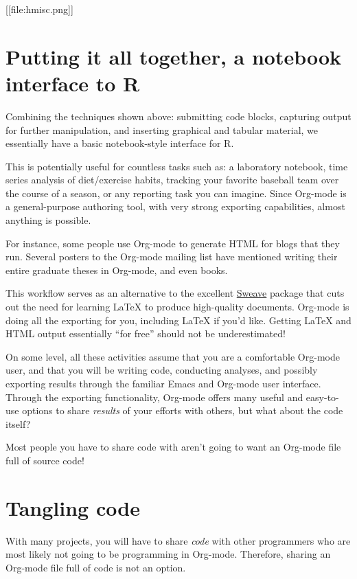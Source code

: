 \documentclass[11pt]{article}
\begin{document}
[[file:hmisc.png]]
\section*{Putting it all together, a notebook interface to R}
\label{sec-7}

Combining the techniques shown above: submitting code blocks,
capturing output for further manipulation, and inserting graphical and
tabular material, we essentially have a basic notebook-style interface
for R.

This is potentially useful for countless tasks such as: a laboratory
notebook, time series analysis of diet/exercise habits, tracking your
favorite baseball team over the course of a season, or any reporting
task you can imagine. Since Org-mode is a general-purpose authoring
tool, with very strong exporting capabilities, almost anything is
possible.

For instance, some people use Org-mode to generate HTML for blogs that
they run. Several posters to the Org-mode mailing list have mentioned
writing their entire graduate theses in Org-mode, and even books.

This workflow serves as an alternative to the excellent \href{http://www.stat.uni-muenchen.de/~leisch/Sweave/}{Sweave} package
that cuts out the need for learning \LaTeX{} to produce high-quality
documents. Org-mode is doing all the exporting for you, including
\LaTeX{} if you'd like. Getting \LaTeX{} and HTML output essentially ``for
free'' should not be underestimated!

On some level, all these activities assume that you are a comfortable
Org-mode user, and that you will be writing code, conducting analyses,
and possibly exporting results through the familiar Emacs and Org-mode
user interface. Through the exporting functionality, Org-mode offers
many useful and easy-to-use options to share \emph{results} of your efforts
with others, but what about the code itself?

Most people you have to share code with aren't going to want an
Org-mode file full of source code!
\section*{Tangling code}
\label{sec-8}

With many projects, you will have to share \emph{code} with other
programmers who are most likely not going to be programming in
Org-mode. Therefore, sharing an Org-mode file full of code is not an
option.
\end{document}
